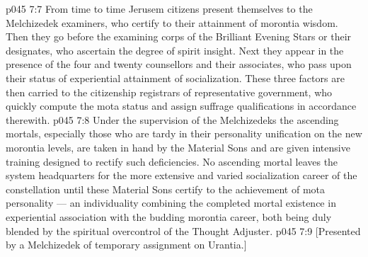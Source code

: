 \vs p045 7:7 From time to time Jerusem citizens present themselves to the Melchizedek examiners, who certify to their attainment of morontia wisdom. Then they go before the examining corps of the Brilliant Evening Stars or their designates, who ascertain the degree of spirit insight. Next they appear in the presence of the four and twenty counsellors and their associates, who pass upon their status of experiential attainment of socialization. These three factors are then carried to the citizenship registrars of representative government, who quickly compute the mota status and assign suffrage qualifications in accordance therewith.
\vs p045 7:8 \pc Under the supervision of the Melchizedeks the ascending mortals, especially those who are tardy in their personality unification on the new morontia levels, are taken in hand by the Material Sons and are given intensive training designed to rectify such deficiencies. No ascending mortal leaves the system headquarters for the more extensive and varied socialization career of the constellation until these Material Sons certify to the achievement of mota personality --- an individuality combining the completed mortal existence in experiential association with the budding morontia career, both being duly blended by the spiritual overcontrol of the Thought Adjuster.
\vsetoff
\vs p045 7:9 [Presented by a Melchizedek of temporary assignment on Urantia.]
